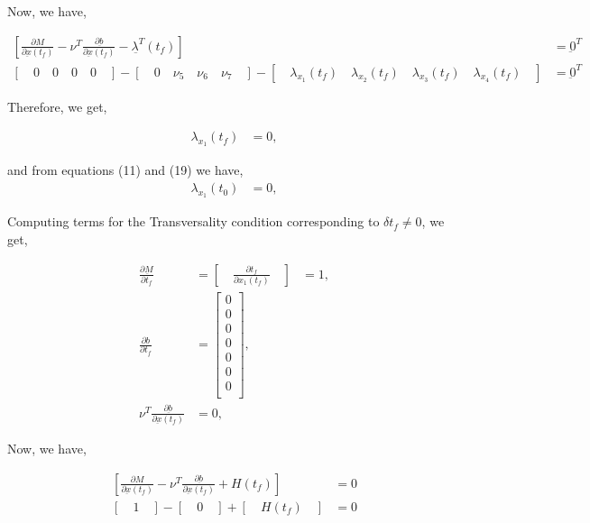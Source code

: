\documentclass[11pt,usenames]{article}
\begin{document}
	Now, we have,
	
	\begin{align}
	\left[ \frac{\partial M}{\partial{\underbar{x}(t_{f})} } - \nu^{T} \frac{\partial \underbar b}{\partial{\underbar{x}(t_{f})} } - \underbar{\lambda^{T}}(t_{f}) \right]&= \underbar 0^{T} \nonumber \\
	\left[ \quad 0 \quad 0 \quad 0 \quad 0 \quad  \right] - \left[ \quad 0 \quad \nu_{5} \quad \nu_{6} \quad \nu_{7} \quad \right] - \left[ \quad \lambda_{x_{1}}(t_{f}) \quad \lambda_{x_{2}}(t_{f}) \quad \lambda_{x_{3}}(t_{f}) \quad \lambda_{x_{4}}(t_{f}) \quad \right] &= \underbar 0^{T} \nonumber 
	\end{align}
	
	Therefore, we get,
	
	\begin{align}
	\lambda_{x_{1}}(t_{f}) &= 0, 
	\end{align}
	
	and from equations (11) and (19) we have,
	\begin{align}
	\lambda_{x_{1}}(t_{0}) &= 0, 
	\end{align}
	
	
	\newpage
	
	
	Computing terms for the Transversality condition corresponding to $\delta t_{f} \neq 0$, we get,
	
	\begin{align}
	\frac{\partial{\underbar M}}{\partial{ t_{f}}} &= \left[ \quad \frac{\partial t_{f}}{\partial{x_{1}(t_{f})}}  \quad  \right] &= 1 ,  \\
	\frac{\partial b}{\partial{ t_{f}}} &= 
	\begin{bmatrix}
	0 \\ 0 \\ 0 \\ 0 \\ 0 \\ 0 \\ 0 \\
	\end{bmatrix},  \\
	\nu^{T} \frac{\partial \underbar b}{\partial{\underbar{x}(t_{f})} } &= 0,
	\end{align}
	
	Now, we have,
	
	\begin{align}
	\left[ \frac{\partial M}{\partial{\underbar{x}(t_{f})} } - \nu^{T} \frac{\partial \underbar b}{\partial{\underbar{x}(t_{f})} } + H(t_{f}) \right]&=  0 \nonumber \\
	\left[ \quad 1 \quad  \right] - \left[ \quad 0 \quad  \right] + \left[ \quad H(t_{f}) \quad \right] &=  0 \nonumber 
	\end{align}
	
\end{document}
